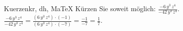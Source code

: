 \begin{MAufgabe}{Kuerzen}{kr, dh, MaTeX}
K\"urzen Sie soweit m\"oglich: $\frac{- 6\, y^3\, z^4}{- 42\, y^3\, z^4}$.\\ 
\ifLsg\MLoesung
\quad $\frac{- 6\, y^3\, z^4}{- 42\, y^3\, z^4}=\frac{(6\, y^3\, z^4)\cdot(-1)}{(6\, y^3\, z^4)\cdot(-7)}=\frac{-1}{-7}=\frac{1}{7}$.\else\relax\fi
 \end{MAufgabe}